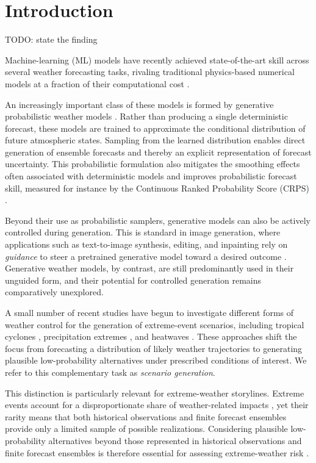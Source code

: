 \chapter{Introduction}
\label{ch:intro}

TODO: state the finding 

Machine-learning (ML) models have recently achieved state-of-the-art skill across several weather forecasting tasks, rivaling traditional physics-based numerical models at a fraction of their computational cost 
\parencite{lam2023graphcast,bi2023pangu}.

An increasingly important class of these models is formed by generative
probabilistic weather models
\parencite{price2023gencast,couairon2024archesweather}.
Rather than producing a single deterministic forecast, these models are trained
to approximate the conditional distribution of future atmospheric states.
Sampling from the learned distribution enables direct generation of
ensemble forecasts and thereby an explicit representation of forecast
uncertainty.
This probabilistic formulation also mitigates the smoothing effects often
associated with deterministic models and improves probabilistic forecast skill,
measured for instance by the Continuous Ranked Probability Score (CRPS)
\parencite{hersbach2000crps,price2023gencast}.

Beyond their use as probabilistic samplers, generative models can also be
actively controlled during generation. This is standard in image generation,
where applications such as text-to-image synthesis, editing, and inpainting
rely on \emph{guidance} to steer a pretrained generative model toward a desired
outcome
\parencite{dhariwal2021diffusion,ho2022classifierfree,nichol2021glide}.
Generative weather models, by contrast, are still predominantly used in their
unguided form, and their potential for controlled generation remains
comparatively unexplored.

A small number of recent studies have begun to investigate different forms of
weather control for the generation of extreme-event scenarios, including
tropical cyclones \parencite{brenowitz2025climate}, precipitation extremes
\parencite{ueyama2026guided}, and heatwaves
\parencite{whittaker2025heatwaves}.
These approaches shift the focus from forecasting a distribution of likely
weather trajectories to generating plausible low-probability alternatives
under prescribed conditions of interest. We refer to this complementary task
as \emph{scenario generation}.

This distinction is particularly relevant for extreme-weather storylines.
Extreme events account for a disproportionate share of weather-related impacts
\parencite{wmo2023atlas}, yet their rarity means that both historical
observations and finite forecast ensembles provide only a limited sample of
possible realizations. Considering plausible low-probability alternatives
beyond those represented in historical observations and finite forecast
ensembles is therefore essential for assessing extreme-weather risk
\parencite{thompson2017unseen,shepherd2018storylines}.

